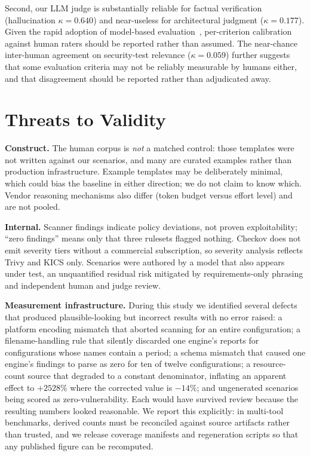 \documentclass[conference]{IEEEtran}
\begin{document}
Second, our LLM judge is substantially reliable for factual verification
(hallucination $\kappa=0.640$) and near-useless for architectural judgment
($\kappa=0.177$). Given the rapid adoption of model-based
evaluation~\cite{zheng2023judging,gu2025survey}, per-criterion calibration
against human raters should be reported rather than assumed. The near-chance
inter-human agreement on security-test relevance ($\kappa=0.059$) further
suggests that some evaluation criteria may not be reliably measurable by humans
either, and that disagreement should be reported rather than adjudicated away.

\section{Threats to Validity}
\label{sec:threats}

\textbf{Construct.} The human corpus is \emph{not} a matched control: those
templates were not written against our scenarios, and many are curated examples
rather than production infrastructure. Example templates may be deliberately
minimal, which could bias the baseline in either direction; we do not claim to
know which. Vendor reasoning mechanisms also differ (token budget versus effort
level) and are not pooled.

\textbf{Internal.} Scanner findings indicate policy deviations, not proven
exploitability; ``zero findings'' means only that three rulesets flagged nothing.
Checkov does not emit severity tiers without a commercial subscription, so
severity analysis reflects Trivy and KICS only. Scenarios were authored by a
model that also appears under test, an unquantified residual risk mitigated by
requirements-only phrasing and independent human and judge review.

\textbf{Measurement infrastructure.} During this study we identified several
defects that produced plausible-looking but incorrect results with no error
raised: a platform encoding mismatch that aborted scanning for an entire
configuration; a filename-handling rule that silently discarded one engine's
reports for configurations whose names contain a period; a schema mismatch that
caused one engine's findings to parse as zero for ten of twelve configurations;
a resource-count source that degraded to a constant denominator, inflating an
apparent effect to $+2528\%$ where the corrected value is $-14\%$; and
ungenerated scenarios being scored as zero-vulnerability. Each would have
survived review because the resulting numbers looked reasonable. We report this
explicitly: in multi-tool benchmarks, derived counts must be reconciled against
source artifacts rather than trusted, and we release coverage manifests and
regeneration scripts so that any published figure can be recomputed.
\end{document}

